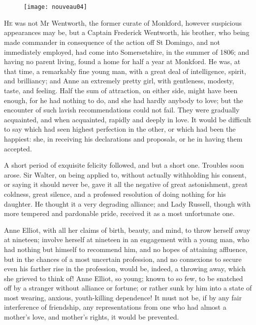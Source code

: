 \chapter[Chapter \thechapter]{}
	
	\begin{figure}[t!]
\centering
\texttt{[image: nouveau04]}
\end{figure}

\lettrine[lraise=0.3]{H}{e} was not Mr Wentworth, the former curate of Monkford, however suspicious appearances may be, but a Captain Frederick Wentworth, his brother, who being made commander in consequence of the action off St Domingo, and not immediately employed, had come into Somersetshire, in the summer of 1806; and having no parent living, found a home for half a year at Monkford. He was, at that time, a remarkably fine young man, with a great deal of intelligence, spirit, and brilliancy; and Anne an extremely pretty girl, with gentleness, modesty, taste, and feeling. Half the sum of attraction, on either side, might have been enough, for he had nothing to do, and she had hardly anybody to love; but the encounter of such lavish recommendations could not fail. They were gradually acquainted, and when acquainted, rapidly and deeply in love. It would be difficult to say which had seen highest perfection in the other, or which had been the happiest: she, in receiving his declarations and proposals, or he in having them accepted.

A short period of exquisite felicity followed, and but a short one. Troubles soon arose. Sir Walter, on being applied to, without actually withholding his consent, or saying it should never be, gave it all the negative of great astonishment, great coldness, great silence, and a professed resolution of doing nothing for his daughter. He thought it a very degrading alliance; and Lady Russell, though with more tempered and pardonable pride, received it as a most unfortunate one.

Anne Elliot, with all her claims of birth, beauty, and mind, to throw herself away at nineteen; involve herself at nineteen in an engagement with a young man, who had nothing but himself to recommend him, and no hopes of attaining affluence, but in the chances of a most uncertain profession, and no connexions to secure even his farther rise in the profession, would be, indeed, a throwing away, which she grieved to think of! Anne Elliot, so young; known to so few, to be snatched off by a stranger without alliance or fortune; or rather sunk by him into a state of most wearing, anxious, youth-killing dependence! It must not be, if by any fair interference of friendship, any representations from one who had almost a mother's love, and mother's rights, it would be prevented.

